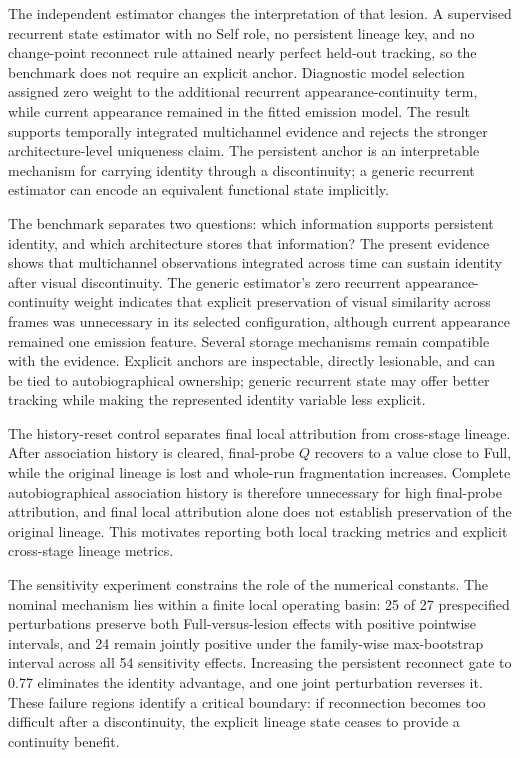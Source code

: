 \documentclass[journal]{IEEEtran}
\begin{document}
The independent estimator changes the interpretation of that lesion. A supervised recurrent state estimator with no Self role, no persistent lineage key, and no change-point reconnect rule attained nearly perfect held-out tracking, so the benchmark does not require an explicit anchor. Diagnostic model selection assigned zero weight to the additional recurrent appearance-continuity term, while current appearance remained in the fitted emission model. The result supports temporally integrated multichannel evidence and rejects the stronger architecture-level uniqueness claim. The persistent anchor is an interpretable mechanism for carrying identity through a discontinuity; a generic recurrent estimator can encode an equivalent functional state implicitly.

The benchmark separates two questions: which information supports persistent identity, and which architecture stores that information? The present evidence shows that multichannel observations integrated across time can sustain identity after visual discontinuity. The generic estimator's zero recurrent appearance-continuity weight indicates that explicit preservation of visual similarity across frames was unnecessary in its selected configuration, although current appearance remained one emission feature. Several storage mechanisms remain compatible with the evidence. Explicit anchors are inspectable, directly lesionable, and can be tied to autobiographical ownership; generic recurrent state may offer better tracking while making the represented identity variable less explicit.

The history-reset control separates final local attribution from cross-stage lineage. After association history is cleared, final-probe $Q$ recovers to a value close to Full, while the original lineage is lost and whole-run fragmentation increases. Complete autobiographical association history is therefore unnecessary for high final-probe attribution, and final local attribution alone does not establish preservation of the original lineage. This motivates reporting both local tracking metrics and explicit cross-stage lineage metrics.

The sensitivity experiment constrains the role of the numerical constants. The nominal mechanism lies within a finite local operating basin: 25 of 27 prespecified perturbations preserve both Full-versus-lesion effects with positive pointwise intervals, and 24 remain jointly positive under the family-wise max-bootstrap interval across all 54 sensitivity effects. Increasing the persistent reconnect gate to 0.77 eliminates the identity advantage, and one joint perturbation reverses it. These failure regions identify a critical boundary: if reconnection becomes too difficult after a discontinuity, the explicit lineage state ceases to provide a continuity benefit.
\end{document}
